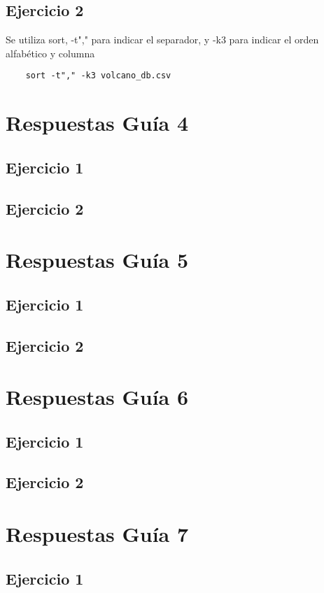 \subsection{Ejercicio 2}
Se utiliza sort, -t"," para indicar el separador, y -k3 para indicar el orden alfabético y columna
\begin{verbatim}
	sort -t"," -k3 volcano_db.csv
\end{verbatim}
\newpage
\section{Respuestas Guía 4}
\subsection{Ejercicio 1}

\newpage
\subsection{Ejercicio 2}
\newpage
\section{Respuestas Guía 5}
\subsection{Ejercicio 1}
\newpage
\subsection{Ejercicio 2}
\newpage
\section{Respuestas Guía 6}
\subsection{Ejercicio 1}
\newpage
\subsection{Ejercicio 2}
\newpage
\section{Respuestas Guía 7}
\subsection{Ejercicio 1}
\newpage
